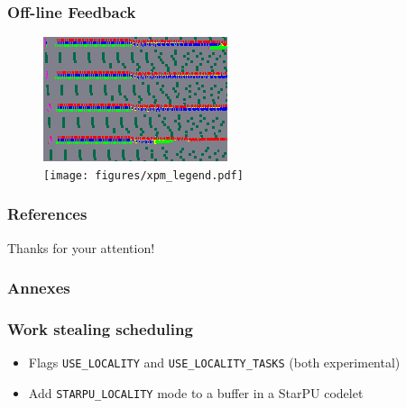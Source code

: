 \documentclass[10pt,a4paper]{beamer}
\begin{document}
\begin{frame}
\frametitle{Off-line Feedback}
\begin{figure}
  \center
  \includegraphics[width=0.6\linewidth]{figures/locality_attila_ws_zoom.png} \\
  \vfill
  \texttt{[image: figures/xpm\_legend.pdf]}
\end{figure}
\end{frame}

\begin{frame}
  \frametitle{References}
\printbibliography
\end{frame}

\begin{frame}
  \Huge{\centerline{Thanks for your attention!}}
\end{frame}

\begin{frame}
  \frametitle{Annexes}
\end{frame}

\begin{frame}
  \frametitle{Work stealing scheduling}
  \begin{itemize}
  \vfill
  \item Flags \texttt{USE\_LOCALITY} and \texttt{USE\_LOCALITY\_TASKS} (both experimental)
    \vfill
  \item Add \texttt{STARPU\_LOCALITY} mode to a buffer in a StarPU codelet
  \vfill
  \end{itemize}
\end{frame}
\end{document}
